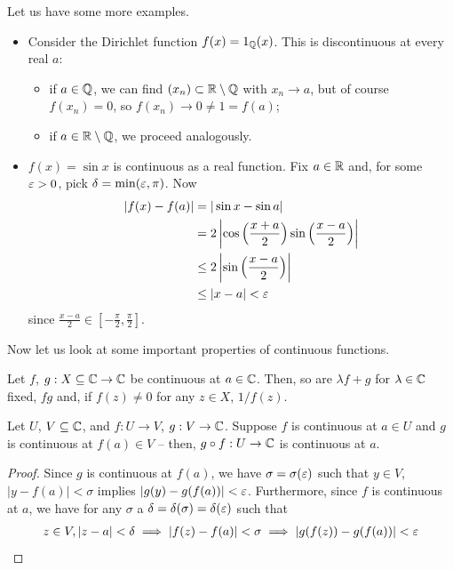\documentclass{../template/note}
\begin{document}
    \begin{example*}
        Let us have some more examples.
        \begin{itemize}
            \item Consider the Dirichlet function \(f(x) = 1_\mathbb Q(x)\). This is discontinuous at every real \(a\):
            \begin{itemize}
                \item if \(a \in \mathbb Q\), we can find \((x_n) \subset \mathbb R \setminus \mathbb Q\) with \(x_n \to a\), but of course \(f(x_n) = 0\), so \(f(x_n) \to 0 \neq 1 = f(a)\);
                \item if \(a \in \mathbb R \setminus \mathbb Q\), we proceed analogously.
            \end{itemize}
            \item \(f(x) = \sin x\) is continuous as a real function. Fix \(a \in \mathbb R\) and, for some \(\varepsilon > 0\), pick \(\delta = \min(\varepsilon, \pi)\). Now
            \begin{align*}
                |f(x)-f(a)| &= |\sin x - \sin a| \\
                &= 2\left|\cos\left(\frac{x+a}2\right)\sin\left(\frac{x-a}2\right)\right| \\
                &\leq 2\left|\sin\left(\frac{x-a}2\right)\right| \\
                &\leq |x-a| < \varepsilon
            \end{align*}
            since \(\frac{x-a}{2} \in \left[-\frac \pi 2, \frac \pi 2\right]\).
        \end{itemize}
    \end{example*}
    
    Now let us look at some important properties of continuous functions.    

    \begin{lemma}
        Let \(f\), \(g: X \subseteq \mathbb C \to \mathbb C\) be continuous at \(a \in \mathbb C\). Then, so are \(\lambda f + g\) for \(\lambda \in \mathbb C\) fixed, \(fg\) and, if \(f(z) \neq 0\) for any \(z \in X\), \(1/f(z)\).
    \end{lemma}
    
    \begin{lemma}
        Let \(U\), \(V \subseteq \mathbb C\), and \(f: U \to V\), \(g: V \to \mathbb C\). Suppose \(f\) is continuous at \(a \in U\) and \(g\) is continuous at \(f(a) \in V\) -- then, \(g \circ f: U \to \mathbb C\) is continuous at \(a\).
    \end{lemma}
    
    \begin{proof}
        Since \(g\) is continuous at \(f(a)\), we have \(\sigma = \sigma(\varepsilon)\) such that \(y \in V\), \(|y-f(a)| < \sigma\) implies \(|g(y) - g(f(a))| < \varepsilon\). Furthermore, since \(f\) is continuous at \(a\), we have for any \(\sigma\) a \(\delta = \delta(\sigma) = \delta(\varepsilon)\) such that
        \begin{align*}
            z \in V, |z-a| < \delta \implies |f(z) - f(a)| < \sigma \implies |g(f(z)) - g(f(a))| < \varepsilon
        \end{align*}
    \end{proof}
    
\end{document}
